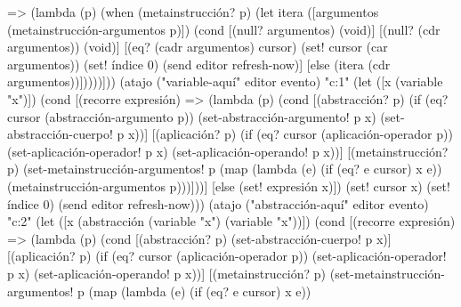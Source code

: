 \documentclass[10pt,oneside,openany,letterpaper]{book}
\begin{document}
                    => (lambda (p)
                         (when (metainstrucción? p)
                           (let itera ([argumentos (metainstrucción-argumentos p)])
                             (cond [(null? argumentos) (void)]
                                   [(null? (cdr argumentos)) (void)]
                                   [(eq? (cadr argumentos) cursor)
                                    (set! cursor (car argumentos))
                                    (set! índice 0)
                                    (send editor refresh-now)]
                                   [else (itera (cdr argumentos))]))))]))
      (atajo ("variable-aquí" editor evento) "c:1"
             (let ([x (variable "x")])
               (cond [(recorre expresión)
                      => (lambda (p)
                           (cond [(abstracción? p)
                                  (if (eq? cursor (abstracción-argumento p))
                                      (set-abstracción-argumento! p x)
                                      (set-abstracción-cuerpo! p x))]
                                 [(aplicación? p)
                                  (if (eq? cursor (aplicación-operador p))
                                      (set-aplicación-operador! p x)
                                      (set-aplicación-operando! p x))]
                                 [(metainstrucción? p)
                                  (set-metainstrucción-argumentos! p
                                   (map (lambda (e)
                                          (if (eq? e cursor) x e))
                                        (metainstrucción-argumentos p)))]))]
                     [else
                      (set! expresión x)])
               (set! cursor x)
               (set! índice 0)
               (send editor refresh-now)))
      (atajo ("abstracción-aquí" editor evento) "c:2"
             (let ([x (abstracción (variable "x") (variable "x"))])
               (cond [(recorre expresión)
                      => (lambda (p)
                           (cond [(abstracción? p)
                                  (set-abstracción-cuerpo! p x)]
                                 [(aplicación? p)
                                  (if (eq? cursor (aplicación-operador p))
                                      (set-aplicación-operador! p x)
                                      (set-aplicación-operando! p x))]
                                 [(metainstrucción? p)
                                  (set-metainstrucción-argumentos! p
                                   (map (lambda (e)
                                          (if (eq? e cursor) x e))
\end{document}
